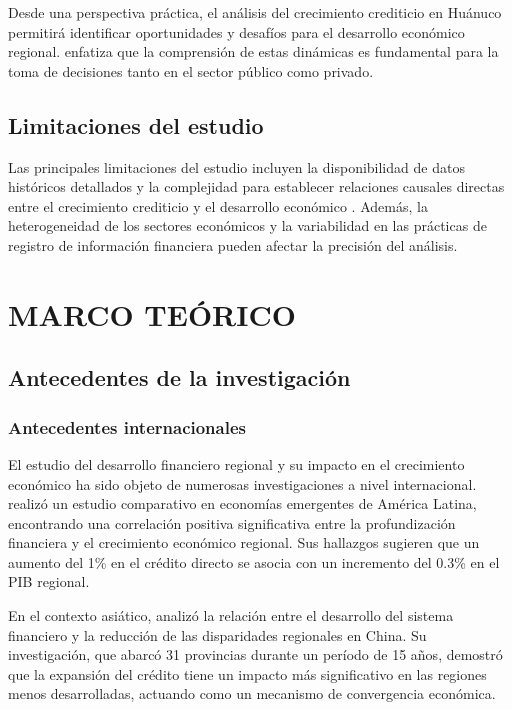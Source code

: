 \documentclass[12pt, a4paper]{article}
\begin{document}
Desde una perspectiva práctica, el análisis del crecimiento crediticio en Huánuco permitirá identificar oportunidades y desafíos para el desarrollo económico regional. \textcite{Santos2023} enfatiza que la comprensión de estas dinámicas es fundamental para la toma de decisiones tanto en el sector público como privado.

\subsection{Limitaciones del estudio}

Las principales limitaciones del estudio incluyen la disponibilidad de datos históricos detallados y la complejidad para establecer relaciones causales directas entre el crecimiento crediticio y el desarrollo económico \parencite{Torres2022}. Además, la heterogeneidad de los sectores económicos y la variabilidad en las prácticas de registro de información financiera pueden afectar la precisión del análisis.

\section{MARCO TEÓRICO}

\subsection{Antecedentes de la investigación}

\subsubsection{Antecedentes internacionales}
El estudio del desarrollo financiero regional y su impacto en el crecimiento económico ha sido objeto de numerosas investigaciones a nivel internacional. \textcite{Beck2021} realizó un estudio comparativo en economías emergentes de América Latina, encontrando una correlación positiva significativa entre la profundización financiera y el crecimiento económico regional. Sus hallazgos sugieren que un aumento del 1\% en el crédito directo se asocia con un incremento del 0.3\% en el PIB regional.

En el contexto asiático, \textcite{Chen2023} analizó la relación entre el desarrollo del sistema financiero y la reducción de las disparidades regionales en China. Su investigación, que abarcó 31 provincias durante un período de 15 años, demostró que la expansión del crédito tiene un impacto más significativo en las regiones menos desarrolladas, actuando como un mecanismo de convergencia económica.
\end{document}
